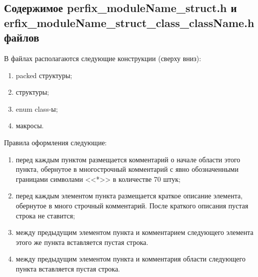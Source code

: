 \subsection{Содержимое perfix\_moduleName\_struct.h и\\erfix\_moduleName\_struct\_class\_className.h файлов}\label{p:struc:h}
В файлах располагаются следующие конструкции (сверху вниз):
\begin{enumerate}
	\item packed структуры;
	\item структуры;
	\item enum class-ы;
	\item макросы.
\end{enumerate}
Правила оформления следующие:
\begin{enumerate}
	\item перед каждым пунктом размещается комментарий о начале области этого пункта, обернутое в многострочный комментарий с явно обозначенными границами символами <<*>> в количестве 70 штук;
	\item перед каждым элементом пункта размещается краткое описание элемента, обернутое в много строчный комментарий. После краткого описания пустая строка не ставится;
	\item между предыдущим элементом пункта и комментарием следующего элемента этого же пункта вставляется пустая строка.
	\item между предыдущим элементом пункта и комментария области следующего пункта вставляется пустая строка.
\end{enumerate}
